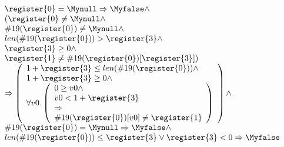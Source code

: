 
$$\begin{array}{l}
 \register{0} = \Mynull  \Rightarrow \Myfalse \wedge \\
  ( \register{0} \ne \Mynull \wedge \\
     \#19(\register{0}) \ne \Mynull  \wedge \\
      len(\#19(\register{0})) > \register{3} \wedge \\
      \register{3} \geq 0 \wedge  \\
      \register{1} \ne \#19(\register{0})[\register{3}])  \\
             \Rightarrow \left(\begin{array}{l}
                        1+ \register{3} \leq len(\#19(\register{0})) \wedge  \\
                        1 + \register{3} \geq 0  \wedge \\ 
                	\forall  v0 . \left( \begin{array}{l} 0 \geq v0  \wedge \\
                                                               v0 < 1 + \register{3} \\
                                                               \Rightarrow  \\
                  		            \#19(\register{0})[v0] \ne \register{1}     \\
                			 \end{array} \right)
                              \end{array} \right)
		\wedge \\
      \#19(\register{0}) = \Mynull \Rightarrow \Myfalse \wedge  \\
      len(\#19(\register{0})) \leq \register{3} \vee \register{3} < 0 \Rightarrow \Myfalse 
\end{array}$$



